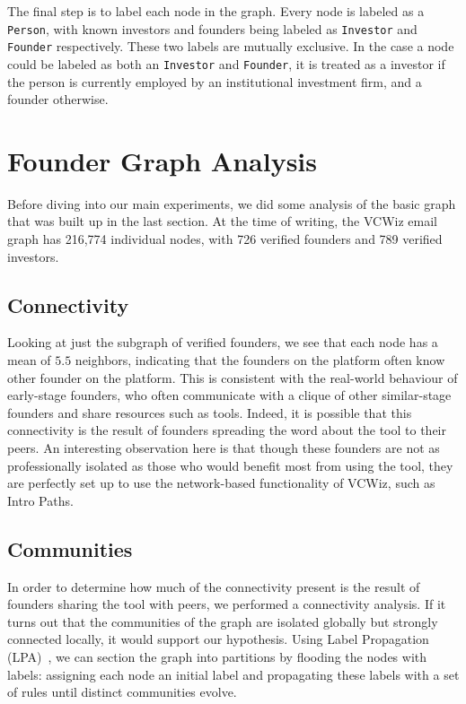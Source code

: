 The final step is to label each node in the graph. Every node is labeled as a \texttt{Person}, with known investors and founders being labeled as \texttt{Investor} and \texttt{Founder} respectively. These two labels are mutually exclusive. In the case a node could be labeled as both an \texttt{Investor} and \texttt{Founder}, it is treated as a investor if the person is currently employed by an institutional investment firm, and a founder otherwise.

\section{Founder Graph Analysis}

Before diving into our main experiments, we did some analysis of the basic graph that was built up in the last section. At the time of writing, the VCWiz email graph has 216,774 individual nodes, with 726 verified founders and 789 verified investors.

\subsection{Connectivity}

Looking at just the subgraph of verified founders, we see that each node has a mean of $5.5$ neighbors, indicating that the founders on the platform often know other founder on the platform. This is consistent with the real-world behaviour of early-stage founders, who often communicate with a clique of other similar-stage founders and share resources such as tools. Indeed, it is possible that this connectivity is the result of founders spreading the word about the tool to their peers. An interesting observation here is that though these founders are not as professionally isolated as those who would benefit most from using the tool, they are perfectly set up to use the network-based functionality of VCWiz, such as Intro Paths.

\subsection{Communities}

In order to determine how much of the connectivity present is the result of founders sharing the tool with peers, we performed a connectivity analysis. If it turns out that the communities of the graph are isolated globally but strongly connected locally, it would support our hypothesis. Using Label Propagation (LPA)~\cite{2007PhRvE..76c6106R}, we can section the graph into partitions by flooding the nodes with labels: assigning each node an initial label and propagating these labels with a set of rules until distinct communities evolve.

